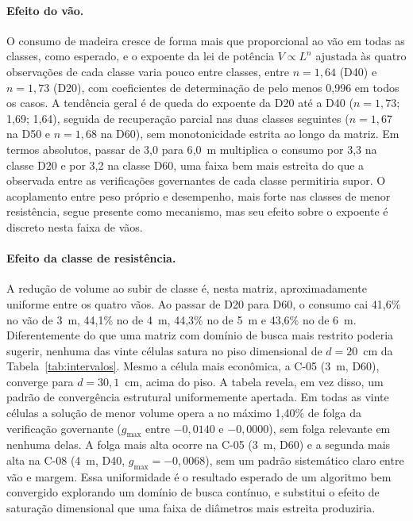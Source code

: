 \paragraph{Efeito do vão.} O consumo de madeira cresce de forma mais que proporcional ao vão em todas as classes, como esperado, e o expoente da lei de potência $V \propto L^{n}$ ajustada às quatro observações de cada classe varia pouco entre classes, entre $n = 1{,}64$ (D40) e $n = 1{,}73$ (D20), com coeficientes de determinação de pelo menos 0{,}996 em todos os casos.
A tendência geral é de queda do expoente da D20 até a D40 ($n = 1{,}73$; 1{,}69; 1{,}64), seguida de recuperação parcial nas duas classes seguintes ($n = 1{,}67$ na D50 e $n = 1{,}68$ na D60), sem monotonicidade estrita ao longo da matriz.
Em termos absolutos, passar de 3{,}0 para 6{,}0~m multiplica o consumo por 3{,}3 na classe D20 e por 3{,}2 na classe D60, uma faixa bem mais estreita do que a observada entre as verificações governantes de cada classe permitiria supor.
O acoplamento entre peso próprio e desempenho, mais forte nas classes de menor resistência, segue presente como mecanismo, mas seu efeito sobre o expoente é discreto nesta faixa de vãos.

\paragraph{Efeito da classe de resistência.} A redução de volume ao subir de classe é, nesta matriz, aproximadamente uniforme entre os quatro vãos. Ao passar de D20 para D60, o consumo cai 41{,}6\% no vão de 3~m, 44{,}1\% no de 4~m, 44{,}3\% no de 5~m e 43{,}6\% no de 6~m.
Diferentemente do que uma matriz com domínio de busca mais restrito poderia sugerir, nenhuma das vinte células satura no piso dimensional de $d = 20$~cm da Tabela~\ref{tab:intervalos}. Mesmo a célula mais econômica, a C-05 (3~m, D60), converge para $d = 30{,}1$~cm, acima do piso.
A tabela revela, em vez disso, um padrão de convergência estrutural uniformemente apertada. Em todas as vinte células a solução de menor volume opera a no máximo 1{,}40\% de folga da verificação governante ($g_{\max}$ entre $-0{,}0140$ e $-0{,}0000$), sem folga relevante em nenhuma delas. A folga mais alta ocorre na C-05 (3~m, D60) e a segunda mais alta na C-08 (4~m, D40, $g_{\max} = -0{,}0068$), sem um padrão sistemático claro entre vão e margem.
Essa uniformidade é o resultado esperado de um algoritmo bem convergido explorando um domínio de busca contínuo, e substitui o efeito de saturação dimensional que uma faixa de diâmetros mais estreita produziria.

